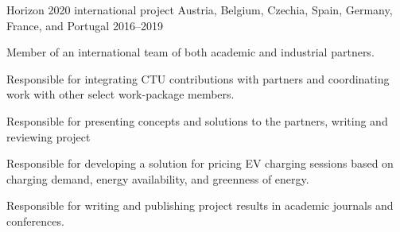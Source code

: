 

\begin{cventries}

  \cventry
    {Horizon 2020 international project} %
    {} %
    {Austria, Belgium, Czechia, Spain,  Germany, France, and Portugal} %
    {2016--2019} %
    {
      \begin{cvitems} %
        \item {Member of an international team of both academic and industrial partners.}
        \item {Responsible for integrating CTU contributions with partners and coordinating work with other select work-package members.}
        \item {Responsible for presenting concepts and solutions to the partners, writing and reviewing project }
        \item {Responsible for developing a solution for pricing EV charging sessions based on charging demand, energy availability, and greenness of energy.}
        \item {Responsible for writing and publishing project results in academic journals and conferences.}
      \end{cvitems}
    }



\end{cventries}
